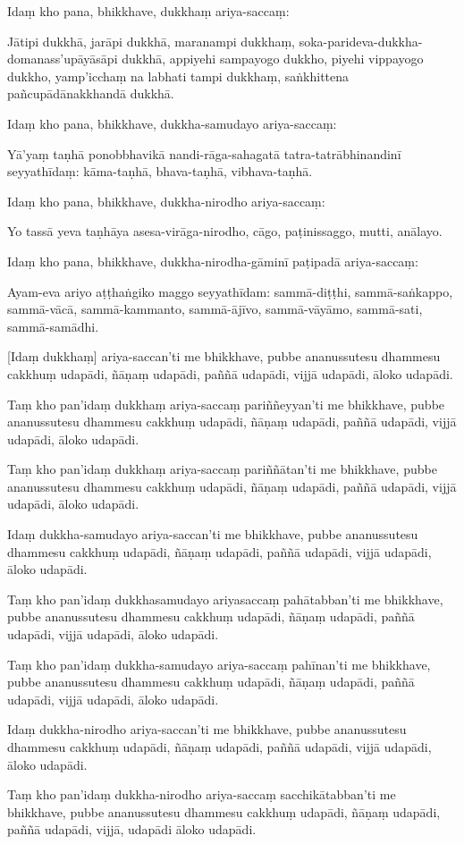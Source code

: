 Idaṃ kho pana, bhikkhave, dukkhaṃ ariya-saccaṃ:

Jātipi dukkhā, jarāpi dukkhā, maranampi dukkhaṃ,
soka-parideva-dukkha-domanass'upāyāsāpi dukkhā, appiyehi sampayogo
dukkho, piyehi vippayogo dukkho, yamp'icchaṃ na labhati tampi dukkhaṃ,
saṅkhittena pañcupādānakkhandā dukkhā.

Idaṃ kho pana, bhikkhave, dukkha-samudayo ariya-saccaṃ:

Yā'yaṃ taṇhā ponobbhavikā nandi-rāga-sahagatā tatra-tatrābhinandinī
seyyathīdaṃ: kāma-taṇhā, bhava-taṇhā, vibhava-taṇhā.

Idaṃ kho pana, bhikkhave, dukkha-nirodho ariya-saccaṃ:

Yo tassā yeva taṇhāya asesa-virāga-nirodho, cāgo, paṭinissaggo, mutti,
anālayo.

Idaṃ kho pana, bhikkhave, dukkha-nirodha-gāminī paṭipadā ariya-saccaṃ:

Ayam-eva ariyo aṭṭhaṅgiko maggo seyyathīdam: sammā-diṭṭhi,
sammā-saṅkappo, sammā-vācā, sammā-kammanto, sammā-ājīvo, sammā-vāyāmo,
sammā-sati, sammā-samādhi.

[Idaṃ dukkhaṃ] ariya-saccan'ti me bhikkhave, pubbe ananussutesu dhammesu
cakkhuṃ udapādi, ñāṇaṃ udapādi, paññā udapādi, vijjā udapādi, āloko
udapādi.

Taṃ kho pan'idaṃ dukkhaṃ ariya-saccaṃ pariññeyyan'ti me bhikkhave, pubbe
ananussutesu dhammesu cakkhuṃ udapādi, ñāṇaṃ udapādi, paññā udapādi,
vijjā udapādi, āloko udapādi.

Taṃ kho pan'idaṃ dukkhaṃ ariya-saccaṃ pariññātan'ti me bhikkhave, pubbe
ananussutesu dhammesu cakkhuṃ udapādi, ñāṇaṃ udapādi, paññā udapādi,
vijjā udapādi, āloko udapādi.

Idaṃ dukkha-samudayo ariya-saccan'ti me bhikkhave, pubbe ananussutesu
dhammesu cakkhuṃ udapādi, ñāṇaṃ udapādi, paññā udapādi, vijjā udapādi,
āloko udapādi.

Taṃ kho pan'idaṃ dukkhasamudayo ariyasaccaṃ pahātabban'ti me bhikkhave,
pubbe ananussutesu dhammesu cakkhuṃ udapādi, ñāṇaṃ udapādi, paññā
udapādi, vijjā udapādi, āloko udapādi.

Taṃ kho pan'idaṃ dukkha-samudayo ariya-saccaṃ pahīnan'ti me bhikkhave, pubbe
ananussutesu dhammesu cakkhuṃ udapādi, ñāṇaṃ udapādi, paññā udapādi,
vijjā udapādi, āloko udapādi.

Idaṃ dukkha-nirodho ariya-saccan'ti me bhikkhave, pubbe ananussutesu
dhammesu cakkhuṃ udapādi, ñāṇaṃ udapādi, paññā udapādi, vijjā udapādi,
āloko udapādi.

Taṃ kho pan'idaṃ dukkha-nirodho ariya-saccaṃ sacchikātabban'ti me bhikkhave,
pubbe ananussutesu dhammesu cakkhuṃ udapādi, ñāṇaṃ udapādi, paññā
udapādi, vijjā, udapādi āloko udapādi.

